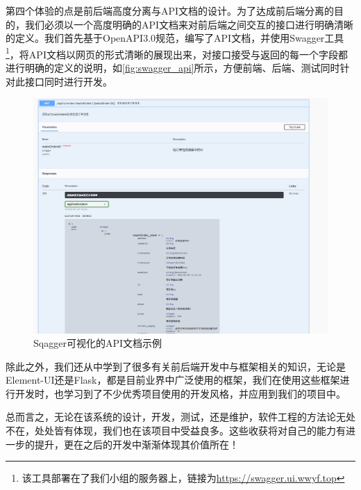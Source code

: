 第四个体验的点是前后端高度分离与API文档的设计。为了达成前后端分离的目的，我们必须以一个高度明确的API文档来对前后端之间交互的接口进行明确清晰的定义。我们首先基于OpenAPI3.0规范，编写了API文档，并使用Swagger工具\footnote{该工具部署在了我们小组的服务器上，链接为\url{https://swagger.ui.wwyf.top}}，将API文档以网页的形式清晰的展现出来，对接口接受与返回的每一个字段都进行明确的定义的说明，如\autoref{fig:swagger_api}所示，方便前端、后端、测试同时针对此接口同时进行开发。

\begin{figure}[htp]
    \centering
    \includegraphics[width=15cm]{report/figure/appendix2/swagger_api.png}
    \caption{Sqagger可视化的API文档示例}
    \label{fig:swagger_api}
\end{figure}

除此之外，我们还从中学到了很多有关前后端开发中与框架相关的知识，无论是Element-UI还是Flask，都是目前业界中广泛使用的框架，我们在使用这些框架进行开发时，也学习到了不少优秀项目使用的开发风格，并应用到我们的项目中。

总而言之，无论在该系统的设计，开发，测试，还是维护，软件工程的方法论无处不在，处处皆有体现，我们也在该项目中受益良多。这些收获将对自己的能力有进一步的提升，更在之后的开发中渐渐体现其价值所在！

\endinput
